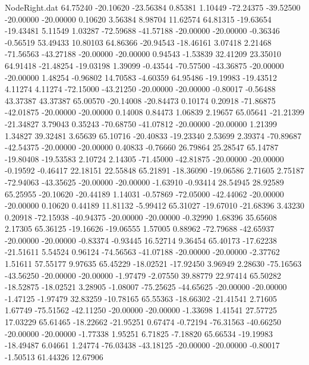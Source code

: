 \begin{filecontents}{NodeRight.dat}
  64.75240  -20.10620  -23.56384     0.85381    1.10449  -72.24375  -39.52500  -20.00000  -20.00000    0.10620    3.56384    8.98704   11.62574
  64.81315  -19.63654  -19.43481     5.11549    1.03287  -72.59688  -41.57188  -20.00000  -20.00000   -0.36346   -0.56519   53.49433   10.80103
  64.86366  -20.94543  -18.46161     3.07418    2.21468  -71.56563  -43.27188  -20.00000  -20.00000    0.94543   -1.53839   32.41209   23.35010
  64.91418  -21.48254  -19.03198     1.39099   -0.43544  -70.57500  -43.36875  -20.00000  -20.00000    1.48254   -0.96802   14.70583   -4.60359
  64.95486  -19.19983  -19.43512     4.11274    4.11274  -72.15000  -43.21250  -20.00000  -20.00000   -0.80017   -0.56488   43.37387   43.37387
  65.00570  -20.14008  -20.84473     0.10174    0.20918  -71.86875  -42.01875  -20.00000  -20.00000    0.14008    0.84473    1.06839    2.19657
  65.05641  -21.21399  -21.34827     3.79043    0.35243  -70.68750  -41.07812  -20.00000  -20.00000    1.21399    1.34827   39.32481    3.65639
  65.10716  -20.40833  -19.23340     2.53699    2.39374  -70.89687  -42.54375  -20.00000  -20.00000    0.40833   -0.76660   26.79864   25.28547
  65.14787  -19.80408  -19.53583     2.10724    2.14305  -71.45000  -42.81875  -20.00000  -20.00000   -0.19592   -0.46417   22.18151   22.55848
  65.21891  -18.36090  -19.06586     2.71605    2.75187  -72.94063  -43.35625  -20.00000  -20.00000   -1.63910   -0.93414   28.54945   28.92589
  65.25955  -20.10620  -20.44189     1.14031   -0.57869  -72.05000  -42.44062  -20.00000  -20.00000    0.10620    0.44189   11.81132   -5.99412
  65.31027  -19.67010  -21.68396     3.43230    0.20918  -72.15938  -40.94375  -20.00000  -20.00000   -0.32990    1.68396   35.65608    2.17305
  65.36125  -19.16626  -19.06555     1.57005    0.88962  -72.79688  -42.65937  -20.00000  -20.00000   -0.83374   -0.93445   16.52714    9.36454
  65.40173  -17.62238  -21.51611     5.54524    0.96124  -74.56563  -41.07188  -20.00000  -20.00000   -2.37762    1.51611   57.55177    9.97635
  65.45229  -18.02521  -17.92450     3.96949    2.28630  -75.16563  -43.56250  -20.00000  -20.00000   -1.97479   -2.07550   39.88779   22.97414
  65.50282  -18.52875  -18.02521     3.28905   -1.08007  -75.25625  -44.65625  -20.00000  -20.00000   -1.47125   -1.97479   32.83259  -10.78165
  65.55363  -18.66302  -21.41541     2.71605    1.67749  -75.51562  -42.11250  -20.00000  -20.00000   -1.33698    1.41541   27.57725   17.03229
  65.61465  -18.22662  -21.95251     0.67474   -0.72194  -76.31563  -40.66250  -20.00000  -20.00000   -1.77338    1.95251    6.71825   -7.18820
  65.66534  -19.19983  -18.49487     6.04661    1.24774  -76.03438  -43.18125  -20.00000  -20.00000   -0.80017   -1.50513   61.44326   12.67906

\end{filecontents}

